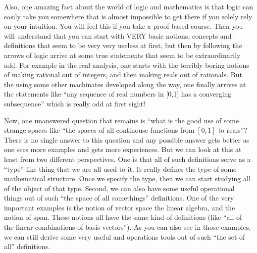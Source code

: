 \documentclass[10pt,a4paper]{article}
\begin{document}
Also, one amazing fact about the world of logic and mathematics is that logic can easily take you somewhere that is almost impossible to get there if you solely rely on your intuition. You will feel this if you take a proof based course. Then you will understand that you can start with VERY basic notions, concepts and definitions that seem to be very very useless at first, but then by following the arrows of logic arrive at some true statements that seem to be extraordinarily add. For example in the real analysis, one starts with the terribly boring notions of making rational out of integers, and then making reals out of rationals. But the using some other machinates developed along the way, one finally arrives at the statements like ``any sequence of real numbers in [0,1] has a converging subsequence'' which is really odd at first sight!

Now, one unanswered question that remains is ``what is the good use of some strange spaces like ``the spaces of all continouse functions from $[0,1]$ to reals''? There is no single answer to this question and any possible answer gets better as one sees more examples and gets more experiences. But we can look at this at least from two different perspectives. One is that all of such definitions serve as a ``type'' like thing that we are all used to it. It really defines the type of some mathematical structure. Once we specify the type, then we can start studying all of the object of that type. Second, we can also have some useful operational things out of such ``the space of all somethings'' definitions. One of the very important examples is the notion of vector space the linear algebra, and the notion of span. These notions all have the same kind of definitions (like ``all of the linear combinations of basis vectors''). As you can also see in those examples, we can still derive some very useful and operations tools out of such ``the set of all'' definitions. 
\end{document}

